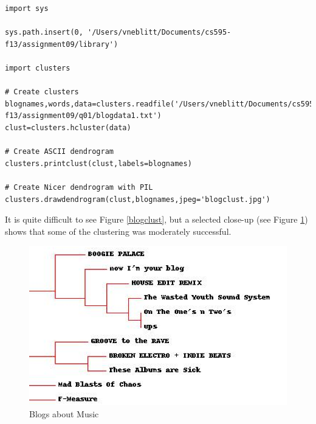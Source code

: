 \documentclass{article}
\begin{document}
\begin{lstlisting}[frame=single, caption=generateImages.py, label=generateImages]
import sys

sys.path.insert(0, '/Users/vneblitt/Documents/cs595-f13/assignment09/library')

import clusters

# Create clusters
blognames,words,data=clusters.readfile('/Users/vneblitt/Documents/cs595-f13/assignment09/q01/blogdata1.txt')
clust=clusters.hcluster(data)

# Create ASCII dendrogram
clusters.printclust(clust,labels=blognames)

# Create Nicer dendrogram with PIL
clusters.drawdendrogram(clust,blognames,jpeg='blogclust.jpg')
\end{lstlisting}

It is quite difficult to see Figure \ref{blogclust}, but a selected close-up (see Figure \ref{musicblogs}) shows that some of the clustering was moderately successful. 

\begin{figure}[H]
\centering
\includegraphics[scale=0.50]{q02/musicblogs}
\caption{Blogs about Music}
\label{musicblogs}
\end{figure}
\end{document}
